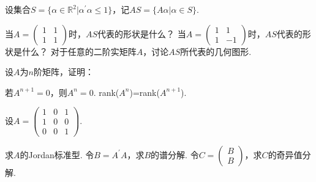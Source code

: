 \documentclass[windows]{BHCexam}
\begin{document}
\begin{groups}
		\begin{questions}
            \question 设集合$S=\{\alpha \in \mathbb{R}^2 \vert \alpha^\prime \alpha \leq 1\}$，记$AS=\{A\alpha \vert \alpha \in S\}$.
            \begin{subquestions}
                \subquestion 当$A=\begin{pmatrix}
                    1 & 1 \\
                    1 & 1
                \end{pmatrix}$时，$AS$代表的形状是什么？
                \subquestion 当$A=\begin{pmatrix}
                    1 & 1 \\
                    1 & -1
                \end{pmatrix}$时，$AS$代表的形状是什么？
                \subquestion 对于任意的二阶实矩阵$A$，讨论$AS$所代表的几何图形.
            \end{subquestions}

        \end{questions}
        
        \begin{questions}
            \question 设$A$为$n$阶矩阵，证明：
            \begin{subquestions}
                \subquestion 若$A^{n+1}=0$，则$A^n=0$.
                \subquestion rank($A^n$)=rank($A^{n+1}$).
            \end{subquestions}
        \end{questions}

        \begin{questions}
            \question 设$A=\begin{pmatrix}
                1 & 0 & 1 \\
                1 & 0 & 0 \\
                0 & 0 & 1 
            \end{pmatrix}$.
            \begin{subquestions}
                \subquestion 求$A$的Jordan标准型.
                \subquestion 令$B=A^\prime A$，求$B$的谱分解.
                \subquestion 令$C=\begin{pmatrix}
                    B \\
                    B
                \end{pmatrix}$，求$C$的奇异值分解.
            \end{subquestions}
        \end{questions}


\end{groups}
\end{document}

